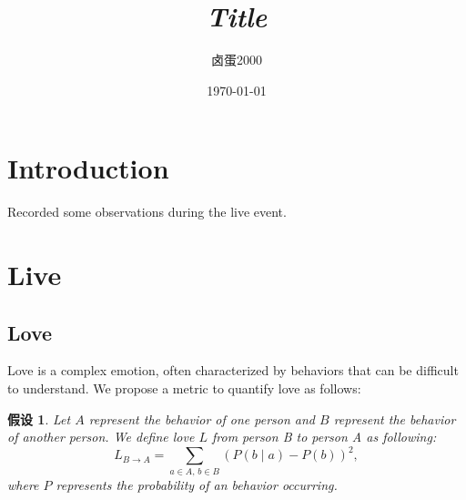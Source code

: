 \documentclass{article}
\title{\textit{Title}}
\author{卤蛋2000}
\date{\today}
\newtheorem{assumption}{假设}
\begin{document}
\maketitle

\section{Introduction}
Recorded some observations during the live event.

\section{Live}
\subsection{Love}
Love is a complex emotion, often characterized by behaviors that can be difficult to understand. We propose a metric to quantify love as follows:

\begin{assumption}
    Let $A$ represent the behavior of one person and $B$ represent the behavior of another person. We define love $L$ from person B to person A as following:
    \begin{equation}
        L_{B\to A}=\sum_{a\in A,\, b\in B}(P(b\mid a)-P(b))^2,
    \end{equation}
    where $P$ represents the probability of an behavior occurring.
\end{assumption}
\end{document}

